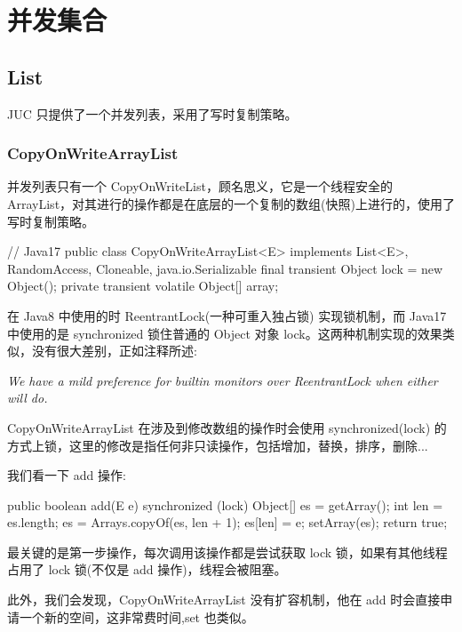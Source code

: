 \section{并发集合}
\subsection{List}

JUC 只提供了一个并发列表，采用了写时复制策略。

\subsubsection{CopyOnWriteArrayList}

并发列表只有一个 CopyOnWriteList，顾名思义，它是一个线程安全的 ArrayList，对其进行的操作都是在底层的一个复制的数组(快照)上进行的，使用了写时复制策略。

\begin{Java}
// Java17
public class CopyOnWriteArrayList<E> implements List<E>, RandomAccess, Cloneable, java.io.Serializable {
    final transient Object lock = new Object();
    private transient volatile Object[] array;
}
\end{Java}

在 Java8 中使用的时 ReentrantLock(一种可重入独占锁) 实现锁机制，而 Java17 中使用的是 synchronized 锁住普通的 Object 对象 lock。这两种机制实现的效果类似，没有很大差别，正如注释所述:

\begin{center}
\textit{We have a mild preference for builtin monitors over ReentrantLock when either will do.}
\end{center}

CopyOnWriteArrayList 在涉及到修改数组的操作时会使用 synchronized(lock) 的方式上锁，这里的修改是指任何非只读操作，包括增加，替换，排序，删除...

我们看一下 add 操作:

\begin{Java}
public boolean add(E e) {
    synchronized (lock) {
        Object[] es = getArray();
        int len = es.length;
        es = Arrays.copyOf(es, len + 1);
        es[len] = e;
        setArray(es);
        return true;
    }
}
\end{Java}

最关键的是第一步操作，每次调用该操作都是尝试获取 lock 锁，如果有其他线程占用了 lock 锁(不仅是 add 操作)，线程会被阻塞。

此外，我们会发现，CopyOnWriteArrayList 没有扩容机制，他在 add 时会直接申请一个新的空间，这非常费时间,set 也类似。

